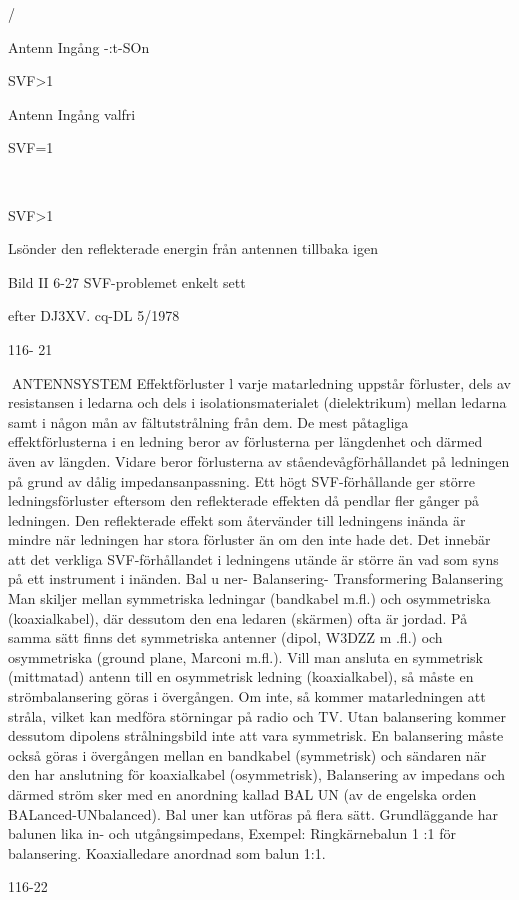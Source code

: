 {{/

Antenn
Ingång
-:t-SOn

SVF>1

Antenn
Ingång
valfri

SVF=1

~

SVF>1

Lsönder den reflekterade energin
från antennen tillbaka igen

Bild II 6-27 SVF-problemet enkelt sett

efter DJ3XV. cq-DL 5/1978

116- 21

ANTENNSYSTEM
Effektförluster
l varje matarledning uppstår förluster, dels
av resistansen i ledarna och dels i isolationsmaterialet (dielektrikum) mellan ledarna samt i någon mån av fältutstrålning från
dem. De mest påtagliga effektförlusterna i
en ledning beror av förlusterna per längdenhet och därmed även av längden. Vidare
beror förlusterna av ståendevågförhållandet på ledningen på grund av dålig impedansanpassning.
Ett högt SVF-förhållande ger större ledningsförluster eftersom den reflekterade effekten då pendlar fler gånger på ledningen.
Den reflekterade effekt som återvänder till
ledningens inända är mindre när ledningen
har stora förluster än om den inte hade det.
Det innebär att det verkliga SVF-förhållandet i ledningens utände är större än vad som
syns på ett instrument i inänden.
Bal u ner- Balansering- Transformering
Balansering
Man skiljer mellan symmetriska ledningar
(bandkabel m.fl.) och osymmetriska (koaxialkabel), där dessutom den ena ledaren (skärmen) ofta är jordad.
På samma sätt finns det symmetriska
antenner (dipol, W3DZZ m .fl.) och osymmetriska (ground plane, Marconi m.fl.).
Vill man ansluta en symmetrisk (mittmatad) antenn till en osymmetrisk ledning
(koaxialkabel), så måste en strömbalansering göras i övergången. Om inte, så kommer matarledningen att stråla, vilket kan
medföra störningar på radio och TV. Utan
balansering kommer dessutom dipolens
strålningsbild inte att vara symmetrisk.
En balansering måste också göras i övergången mellan en bandkabel (symmetrisk)
och sändaren när den har anslutning för
koaxialkabel (osymmetrisk),
Balansering av impedans och därmed
ström sker med en anordning kallad BAL UN
(av de engelska orden BALanced-UNbalanced).
Bal uner kan utföras på flera sätt. Grundläggande har balunen lika in- och utgångsimpedans,
Exempel:
Ringkärnebalun 1 :1 för balansering.
Koaxialledare anordnad som balun 1:1.

116-22

}}
